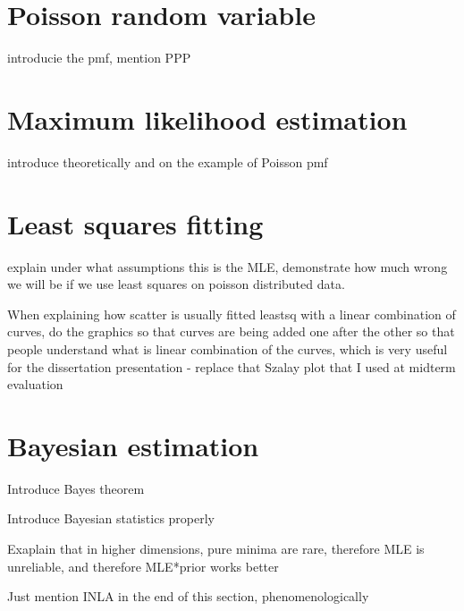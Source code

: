 \section{Poisson random variable}

introducie the pmf, mention PPP

\section{Maximum likelihood estimation}

introduce theoretically and on the example of Poisson pmf

\section{Least squares fitting}

explain under what assumptions this is the MLE, demonstrate how much wrong we will be if we use least squares on poisson distributed data. 

When explaining how scatter is usually fitted leastsq with a linear combination of curves, do the graphics so that curves are being added one after the other so that people understand what is linear combination of the curves, which is very useful for the dissertation presentation - replace that Szalay plot that I used at midterm evaluation

\section{Bayesian estimation}

Introduce Bayes theorem

Introduce Bayesian statistics properly

Exaplain that in higher dimensions, pure minima are rare, therefore MLE is unreliable, and therefore MLE*prior works better

Just mention INLA in the end of this section, phenomenologically












